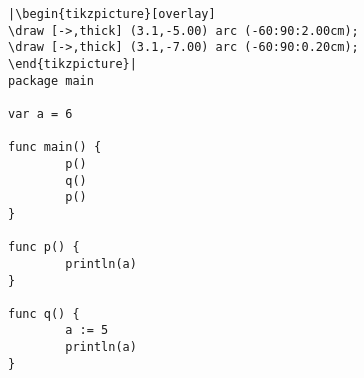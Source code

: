 \begin{lstlisting}[linewidth=.5\textwidth,caption=Local scope,label=src:scope1]
|\begin{tikzpicture}[overlay]
\draw [->,thick] (3.1,-5.00) arc (-60:90:2.00cm);
\draw [->,thick] (3.1,-7.00) arc (-60:90:0.20cm);
\end{tikzpicture}|
package main

var a = 6

func main() {
        p()
        q()
        p()
}

func p() {
        println(a)
}

func q() {
        a := 5
        println(a)
}
\end{lstlisting}
